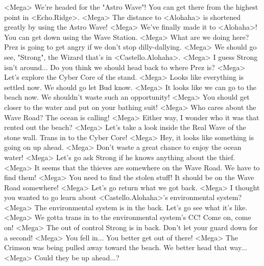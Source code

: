 <Mega> We're headed for the "Astro Wave"! You can 
get there from the highest point in <Echo.Ridge>. 
<Mega> The distance to <Alohaha> is shortened greatly by using the Astro Wave! 
<Mega> We've finally made it to <Alohaha>! You can get down using the Wave Station. 
<Mega> What are we doing here? Prez is going to get angry if we don't stop dilly-dallying. 
<Mega> We should go see, "Strong", the Wizard that's in <Castello.Alohaha>. 
<Mega> I guess Strong isn't around... Do you think we should head back to where Prez is? 
<Mega> Let's explore the Cyber Core of the stand. 
<Mega> Looks like everything is settled now. We should go let Bud know. 
<Mega> It looks like we can go to the beach now. We shouldn't waste such an opportunity! 
<Mega> You should get closer to the water and put on your bathing suit! 
<Mega> Who cares about the Wave Road? The ocean is calling! 
<Mega> Either way, I wonder who it was that rented out the beach? 
<Mega> Let's take a look inside the Real Wave of the stone wall. Trans in to the Cyber Core! 
<Mega> Hey, it looks like something is going on up ahead. 
<Mega> Don't waste a great chance to enjoy the ocean water! 
<Mega> Let's go ask Strong if he knows anything about the thief. 
<Mega> It seems that the thieves are somewhere on the Wave Road. We have to find them! 
<Mega> You need to find the stolen stuff! It should be on the Wave Road somewhere! 
<Mega> Let's go return what we got back. 
<Mega> I thought you wanted to go learn about <Castello.Alohaha>'s environmental system? 
<Mega> The environmental system is in the back. Let's go see what it's like. 
<Mega> We gotta trans in to the environmental system's CC! Come on, come on! 
<Mega> The out of control Strong is in back. Don't let your guard down for a second! 
<Mega> You fell in... You better get out of there! 
<Mega> The Crimson was being pulled away toward the beach. We better head that way... 
<Mega> Could they be up ahead...? 
